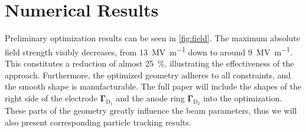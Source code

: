 \documentclass[journal, transmag]{IEEEtran}
\begin{document}
    \section{Numerical Results}
    Preliminary optimization results can be seen in \autoref{fig:field}. The maximum absolute field strength visibly decreases, from \SI{13}{\mega\volt\per\meter} down to around \SI{9}{\mega\volt\per\meter}. This constitutes a reduction of almost \SI{25}{\percent}, illustrating the effectiveness of the approach. Furthermore, the optimized geometry adheres to all constraints, and the smooth shape is manufacturable. The full paper will include the shapes of the right side of the electrode $\boldsymbol{\Gamma}_{\mathrm{D}_1}$ and the anode ring $\boldsymbol{\Gamma}_{\mathrm{D}_2}$ into the optimization. These parts of the geometry greatly influence the beam parameters, thus we will also present corresponding particle tracking results.
\end{document}
